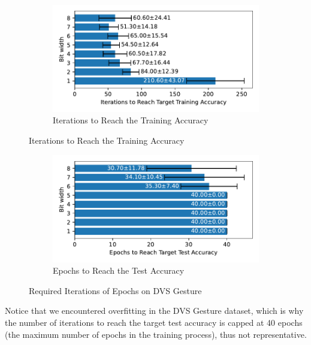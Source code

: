     \label{appendix:iterations_dvs_gesture}
        \begin{figure}[H]
            \centering
            \begin{subfigure}[H]{\textwidth}
                \centering
                \includegraphics[width=\textwidth]{../standard/DVSGesture/plots/dvsgesture_train_iters_horizontal.pdf}
                \caption{Iterations to Reach the Training Accuracy}
            \end{subfigure}
        \end{figure}
        \begin{figure}[H]
            \centering
            \ContinuedFloat
            \begin{subfigure}[H]{\textwidth}
                \centering
                \includegraphics[width=\textwidth]{../standard/DVSGesture/plots/dvsgesture_test_iters_horizontal.pdf}
                \caption{Epochs to Reach the Test Accuracy}
            \end{subfigure}
            \caption{Required Iterations of Epochs on DVS Gesture}
        \end{figure}

    Notice that we encountered overfitting in the DVS Gesture dataset, which is why the number of iterations to reach the target test accuracy is capped at 40 epochs (the maximum number of epochs in the training process), thus not representative. 

